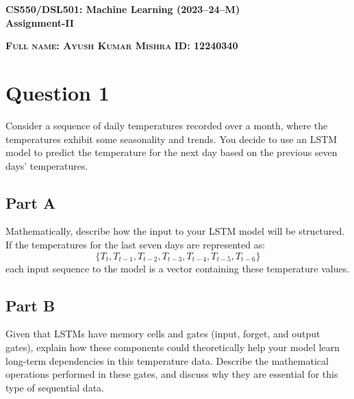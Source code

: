 \documentclass{exam}
\begin{document}
\begin{center}
\textbf{CS550/DSL501: Machine Learning (2023--24--M)} \\
\textbf{Assignment-II}
\end{center}

\vspace{0.2in}

\noindent
\textsc{\textbf{Full name: Ayush Kumar Mishra}}  \hspace{1in} \textsc{\textbf{ID: 12240340}} 

\vspace{0.2in}

\section*{\color{darkblue}Question 1}
Consider a sequence of daily temperatures recorded over a month, where the temperatures exhibit some seasonality and trends. You decide to use an LSTM model to predict the temperature for the next day based on the previous seven days’ temperatures.

\subsection*{\color{blue}Part A}
\noindent Mathematically, describe how the input to your LSTM model will be structured. If the temperatures for the last seven days are represented as:
\[
\{ T_t, T_{t-1}, T_{t-2}, T_{t-3}, T_{t-4}, T_{t-5}, T_{t-6} \}
\]
each input sequence to the model is a vector containing these temperature values. 

\subsection*{\color{blue}Part B}
\noindent Given that LSTMs have memory cells and gates (input, forget, and output gates), explain how these components could theoretically help your model learn long-term dependencies in this temperature data. Describe the mathematical operations performed in these gates, and discuss why they are essential for this type of sequential data.
\end{document}
